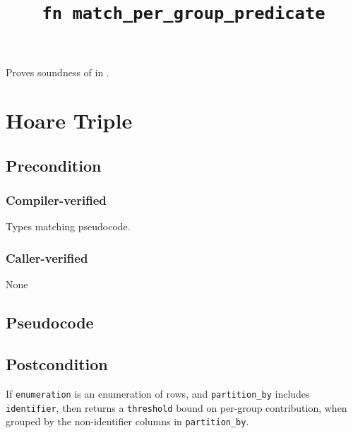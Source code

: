\documentclass{article}
\title{\texttt{fn match\_per\_group\_predicate}}
\author{\MichaelShoemateAuthor}
\begin{document}
\maketitle


\contrib

Proves soundness of 
in .

\section{Hoare Triple}
\subsection*{Precondition}
\subsubsection*{Compiler-verified}
Types matching pseudocode.

\subsubsection*{Caller-verified}
None

\subsection*{Pseudocode}
\label{sec:python-pseudocode}


\subsection*{Postcondition}
\begin{theorem}[Postcondition]
    If \texttt{enumeration} is an enumeration of rows,
    and \texttt{partition\_by} includes \texttt{identifier},
    then returns a \texttt{threshold} bound on per-group contribution,
    when grouped by the non-identifier columns in \texttt{partition\_by}.
\end{theorem}
\end{document}
